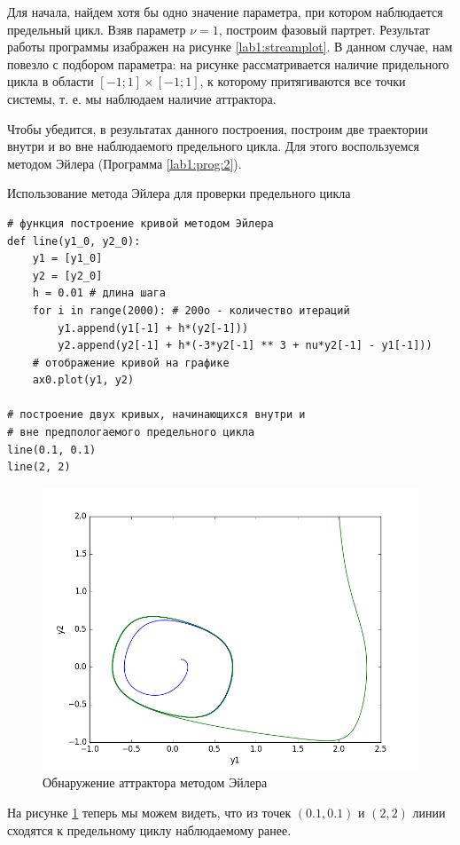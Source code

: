 Для начала, найдем хотя бы одно значение параметра, при котором наблюдается 
предельный цикл. Взяв параметр $\nu = 1$, построим фазовый партрет.
Результат работы программы изабражен на рисунке \ref{lab1:streamplot}.
В данном случае, нам повезло с подбором параметра: на рисунке рассматривается
наличие придельного цикла в области $[-1;1]\times[-1;1]$, к которому 
притягиваются все точки системы, т. е. мы наблюдаем наличие аттрактора.

Чтобы убедится, в результатах данного построения, построим две траектории
внутри и во вне наблюдаемого предельного цикла. Для этого воспользуемся
методом Эйлера (Программа \ref{lab1:prog:2}).

\begin{program}
  \caption{Использование метода Эйлера для проверки предельного цикла}
  \label{lab1:prog:2}
  \begin{verbatim}
# функция построение кривой методом Эйлера
def line(y1_0, y2_0):
    y1 = [y1_0]
    y2 = [y2_0]
    h = 0.01 # длина шага
    for i in range(2000): # 200o - количество итераций
        y1.append(y1[-1] + h*(y2[-1]))
        y2.append(y2[-1] + h*(-3*y2[-1] ** 3 + nu*y2[-1] - y1[-1]))
    # отображение кривой на графике
    ax0.plot(y1, y2)

# построение двух кривых, начинающихся внутри и 
# вне предпологаемого предельного цикла
line(0.1, 0.1)
line(2, 2)
  \end{verbatim}
\end{program}

\clearpage

\begin{figure}[thp]
  \centering
  \includegraphics[width=\textwidth]{figures/1_attractor}
  \caption{Обнаружение аттрактора методом Эйлера}
  \label{lab1:attractor}
\end{figure}

На рисунке \ref{lab1:attractor} теперь мы можем видеть, что из точек $(0.1, 0.1)$
и $(2, 2)$ линии сходятся к предельному циклу наблюдаемому ранее.
